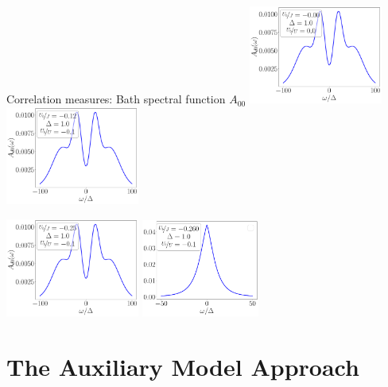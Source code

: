 \documentclass[aspectratio=169]{beamer}
\begin{document}
\begin{frame}[noframenumbering]{Correlation measures: Bath spectral function \(A_{00}\)}
\centering
\hspace*{\fill}
\includegraphics[width=0.33\textwidth]{./figures/spec_func_00_Ub_by_J=-0.000.pdf}
\hspace*{\fill}
\includegraphics[width=0.33\textwidth]{./figures/spec_func_00_Ub_by_J=-0.125.pdf}
\hspace*{\fill}

\hspace*{\fill}
\includegraphics[width=0.33\textwidth]{./figures/spec_func_00_Ub_by_J=-0.250.pdf}
\hspace*{\fill}
\includegraphics[width=0.29\textwidth]{./figures/spec_func_00_Ub_by_J=-0.26.pdf}
\hspace*{\fill}
\end{frame}

\section{The Auxiliary Model Approach}
\label{aux-method}
\end{document}
